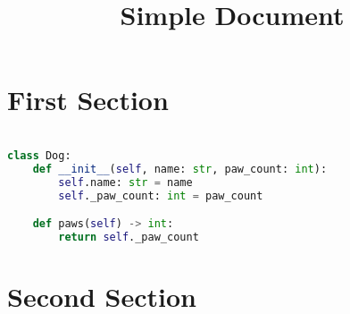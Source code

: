 \documentclass[11pt]{article}
\title{Simple Document}
\author{}
\date{}
\begin{document}
\raggedright
\maketitle

\section*{First Section}
\lipsum[1-2]

\begin{lstlisting}[language=Python]

class Dog:
    def __init__(self, name: str, paw_count: int):
        self.name: str = name
        self._paw_count: int = paw_count

    def paws(self) -> int:
        return self._paw_count
\end{lstlisting}

\section*{Second Section}
\lipsum[3-5]
\end{document}
